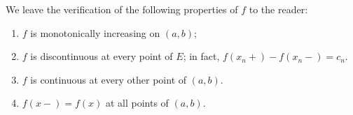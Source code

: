 \documentclass[11pt]{article}
\begin{document}
\begin{itemize}
    We leave the verification of the following properties of \(f\) to the reader:

    \begin{enumerate}[label=(\alph*)]
      \item \(f\) is monotonically increasing on \((a,b)\);
      \item \(f\) is discontinuous at every point of \(E\); in fact, \(f(x_n+) - f(x_n-) = c_n.\)
      \item \(f\) is continuous at every other point of \((a,b)\).
      \item \(f(x-) = f(x)\) at all points of \((a,b)\).
    \end{enumerate}
\end{itemize}
\end{document}
